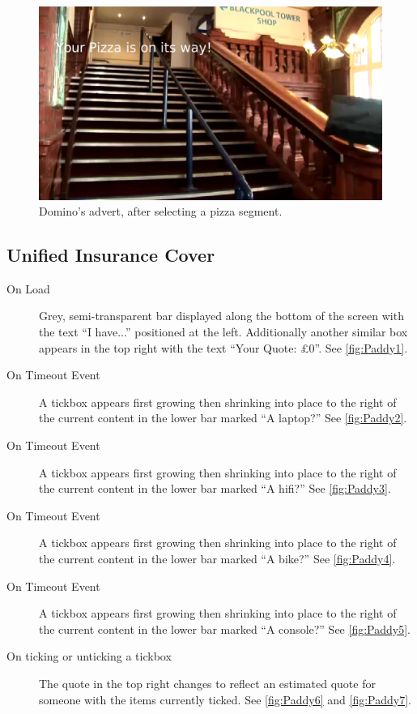 	\begin{figure}[th]
		\centering
		\includegraphics[width=\textwidth,height=0.5\textheight,keepaspectratio]{images/adverts/dominos-3.png}
		\caption{Domino's advert, after selecting a pizza segment.}
		\label{fig:Dominos3}
	\end{figure}

\clearpage
\subsection{Unified Insurance Cover}
	\begin{description}
		\item[On Load]{Grey, semi-transparent bar displayed along the bottom of the screen with the text ``I have...'' positioned at the left. Additionally another similar box appears in the top right with the text ``Your Quote: £0''. See \ref{fig:Paddy1}.}
		\item[On Timeout Event]{A tickbox appears first growing then shrinking into place to the right of the current content in the lower bar marked ``A laptop?'' See \ref{fig:Paddy2}.}
		\item[On Timeout Event]{A tickbox appears first growing then shrinking into place to the right of the current content in the lower bar marked ``A hifi?'' See \ref{fig:Paddy3}.}
		\item[On Timeout Event]{A tickbox appears first growing then shrinking into place to the right of the current content in the lower bar marked ``A bike?'' See \ref{fig:Paddy4}.}
		\item[On Timeout Event]{A tickbox appears first growing then shrinking into place to the right of the current content in the lower bar marked ``A console?'' See \ref{fig:Paddy5}.}
		\item[On ticking or unticking a tickbox]{The quote in the top right changes to reflect an estimated quote for someone with the items currently ticked. See \ref{fig:Paddy6} and \ref{fig:Paddy7}.}
	\end{description}

